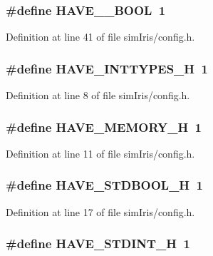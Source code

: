 \subsubsection[{HAVE\_\-\_\-BOOL}]{\setlength{\rightskip}{0pt plus 5cm}\#define HAVE\_\-\_\-BOOL~1}\label{simIris_2config_8h_862ffdbac7ac8323712310a418b7d9a3}




Definition at line 41 of file simIris/config.h.
\subsubsection[{HAVE\_\-INTTYPES\_\-H}]{\setlength{\rightskip}{0pt plus 5cm}\#define HAVE\_\-INTTYPES\_\-H~1}\label{simIris_2config_8h_b90a030ff2790ebdc176660a6dd2a478}




Definition at line 8 of file simIris/config.h.
\subsubsection[{HAVE\_\-MEMORY\_\-H}]{\setlength{\rightskip}{0pt plus 5cm}\#define HAVE\_\-MEMORY\_\-H~1}\label{simIris_2config_8h_e93a78f9d076138897af441c9f86f285}




Definition at line 11 of file simIris/config.h.
\subsubsection[{HAVE\_\-STDBOOL\_\-H}]{\setlength{\rightskip}{0pt plus 5cm}\#define HAVE\_\-STDBOOL\_\-H~1}\label{simIris_2config_8h_8c3fa1b2f1be8c6f6929548c548cf50a}




Definition at line 17 of file simIris/config.h.
\subsubsection[{HAVE\_\-STDINT\_\-H}]{\setlength{\rightskip}{0pt plus 5cm}\#define HAVE\_\-STDINT\_\-H~1}\label{simIris_2config_8h_b6cd6d1c63c1e26ea2d4537b77148354}




